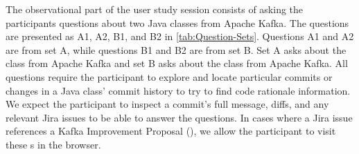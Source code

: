 The observational part of the user study session consists of 
asking the participants questions about two Java classes from Apache Kafka.
The questions are presented as A1, A2, B1, and B2 in \autoref{tab:Question-Sets}.
Questions A1 and A2 are from set A, while questions B1 and B2 are from set B.
Set A asks about the  class from Apache Kafka and 
set B asks about the  class from Apache Kafka.
All questions require the participant to explore and locate particular commits or changes 
in a Java class' commit history to try to find code rationale information.
We expect the participant to inspect a commit's full message,
diffs, and any relevant Jira issues to be able to answer the questions.
In cases where a Jira issue references a Kafka Improvement Proposal (), 
we allow the participant to visit these s in the browser.

